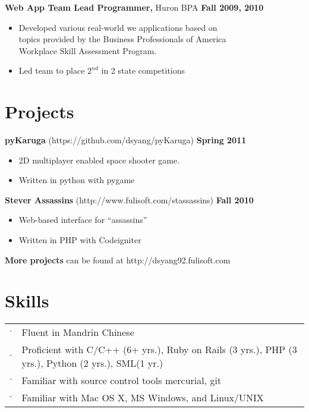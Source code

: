 \documentclass[sectioned]{dsyangres}
\begin{document}
\begin{resume}
\textbf{Web App Team Lead Programmer, }
  Huron BPA \hfill \textbf{Fall 2009, 2010}
  \begin{itemize} \itemsep -2pt %
    \item Developed various real-world we applications based on\\
      topics provided by the Business Professionals of America \\
      Workplace Skill Assessment Program.
    \item Led team to place $2^{nd}$ in 2 state competitions
  \end{itemize}



\section{Projects}

\textbf{pyKaruga} (https://github.com/dsyang/pyKaruga) \hfill \textbf{Spring 2011}
  \begin{itemize} \itemsep -2pt
    \item 2D multiplayer enabled space shooter game.
    \item Written in python with pygame
  \end{itemize}
 
\textbf{Stever Assassins} (http://www.fulisoft.com/stassassins)
 \hfill \textbf{Fall 2010}
  \begin{itemize} \itemsep -2pt
    \item Web-based interface for ``assassins''
    \item Written in PHP with Codeigniter
  \end{itemize}

\textbf{More projects} can be found at http://dsyang92.fulisoft.com

\section{Skills}
  \begin{tabular}{c p{3.5in}}
    $\cdot$ & Fluent in Mandrin Chinese \\
    $\cdot$ & Proficient with C/C++ (6+ yrs.), Ruby on Rails (3 yrs.), PHP (3
       yrs.), Python (2 yrs.), SML(1 yr.)\\
    $\cdot$ & Familiar with source control tools mercurial, git\\
    $\cdot$ & Familiar with Mac OS X, MS Windows, and Linux/UNIX
  \end{tabular}



\end{resume}
\end{document}
